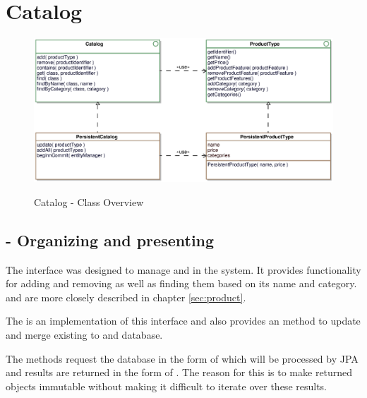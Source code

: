 \newpage
\section{Catalog}
\label{sec:catalog}

\begin{figure}[ht]
	\centering
  \includegraphics[width=1.0\textwidth]{images/Catalog_Overview.eps}
	\label{catalog_overview}
	\caption{Catalog - Class Overview}
\end{figure}

\subsection{ - Organizing and presenting }
The  interface was designed to manage  and  in the system. It provides functionality for adding and removing  as well as finding them based on its name and category.  and  are more closely described in chapter \ref{sec:product}.\par
The  is an implementation of this interface and also provides an  method to update and merge existing  to  and database.\par
The  methods request the database in the form of  which will be processed by JPA and results are returned in the form of . The reason for this is to make returned objects immutable without making it difficult to iterate over these results. 




